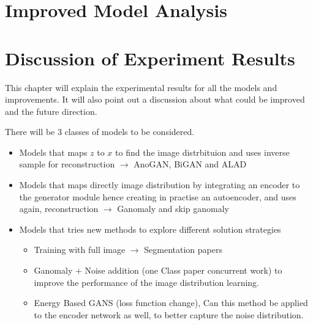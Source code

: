 \section{Improved Model Analysis}
\section{Discussion of Experiment Results}

This chapter will explain the experimental results for all the models and improvements. It will also
point out a discussion about what could be improved and the future direction.

There will be 3 classes of models to be considered. 
\begin{itemize}
    \item Models that maps $z$ to $x$ to find the image distrbituion and uses inverse sample for
    reconstruction $\rightarrow$ AnoGAN, BiGAN and ALAD
    \item Models that maps directly image distribution by integrating an encoder to the generator
    module hence creating in practise an autoencoder, and uses again, reconstruction $\rightarrow$
    Ganomaly and skip ganomaly
    \item Models that tries new methods to explore different solution strategies \begin{itemize}
        \item Training with full image $\rightarrow$ Segmentation papers
        \item Ganomaly + Noise addition (one Class paper concurrent work) to improve the performance
        of the image distribution learning.
        \item Energy Based GANS (loss function change), Can this method be applied to the encoder
        network as well, to better capture the noise distribution.
    \end{itemize}
\end{itemize}

